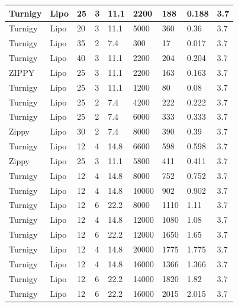 \begin{appendices}
\begin{table}[H]
{\begin{tabular}{|l|l|l|l|l|l|l|l|l|}
Turnigy & Lipo & 25 & 3 & 11.1 & 2200 & 188 & 0.188 & 3.7 \\ \hline
Turnigy & Lipo & 20 & 3 & 11.1 & 5000 & 360 & 0.36 & 3.7 \\ \hline
Turnigy & Lipo & 35 & 2 & 7.4 & 300 & 17 & 0.017 & 3.7 \\ \hline
Turnigy & Lipo & 40 & 3 & 11.1 & 2200 & 204 & 0.204 & 3.7 \\ \hline
ZIPPY & Lipo & 25 & 3 & 11.1 & 2200 & 163 & 0.163 & 3.7 \\ \hline
Turnigy & Lipo & 25 & 3 & 11.1 & 1200 & 80 & 0.08 & 3.7 \\ \hline
Turnigy & Lipo & 25 & 2 & 7.4 & 4200 & 222 & 0.222 & 3.7 \\ \hline
Turnigy & Lipo & 25 & 2 & 7.4 & 6000 & 333 & 0.333 & 3.7 \\ \hline
Zippy & Lipo & 30 & 2 & 7.4 & 8000 & 390 & 0.39 & 3.7 \\ \hline
Turnigy & Lipo & 12 & 4 & 14.8 & 6600 & 598 & 0.598 & 3.7 \\ \hline
Zippy & Lipo & 25 & 3 & 11.1 & 5800 & 411 & 0.411 & 3.7 \\ \hline
Turnigy & Lipo & 12 & 4 & 14.8 & 8000 & 752 & 0.752 & 3.7 \\ \hline
Turnigy & Lipo & 12 & 4 & 14.8 & 10000 & 902 & 0.902 & 3.7 \\ \hline
Turnigy & Lipo & 12 & 6 & 22.2 & 8000 & 1110 & 1.11 & 3.7 \\ \hline
Turnigy & Lipo & 12 & 4 & 14.8 & 12000 & 1080 & 1.08 & 3.7 \\ \hline
Turnigy & Lipo & 12 & 6 & 22.2 & 12000 & 1650 & 1.65 & 3.7 \\ \hline
Turnigy & Lipo & 12 & 4 & 14.8 & 20000 & 1775 & 1.775 & 3.7 \\ \hline
Turnigy & Lipo & 12 & 4 & 14.8 & 16000 & 1366 & 1.366 & 3.7 \\ \hline
Turnigy & Lipo & 12 & 6 & 22.2 & 14000 & 1820 & 1.82 & 3.7 \\ \hline
Turnigy & Lipo & 12 & 6 & 22.2 & 16000 & 2015 & 2.015 & 3.7 \\ \hline
\end{tabular}%
}
\end{table}


\end{appendices}
